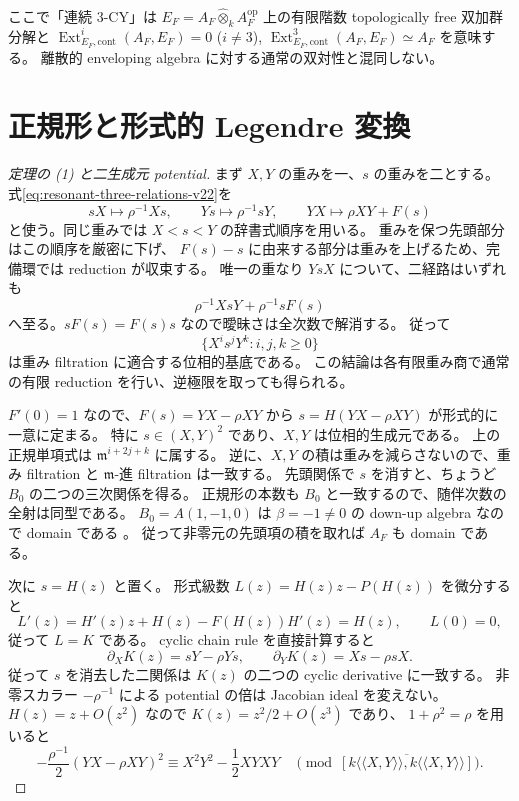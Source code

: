 ここで「連続 $3$-CY」は
$E_F=A_F\widehat\otimes_k A_F^{\mathrm{op}}$ 上の有限階数 topologically free
双加群分解と
$\operatorname{Ext}^i_{E_F,\mathrm{cont}}(A_F,E_F)=0$ ($i\ne3$),
$\operatorname{Ext}^3_{E_F,\mathrm{cont}}(A_F,E_F)\simeq A_F$
を意味する。
離散的 enveloping algebra に対する通常の双対性と混同しない。

\section{正規形と形式的 Legendre 変換}

\begin{proof}[定理の (1) と二生成元 potential]
まず $X,Y$ の重みを一、$s$ の重みを二とする。
式\eqref{eq:resonant-three-relations-v22}を
\[
 sX\longmapsto\rho^{-1}Xs,\qquad
 Ys\longmapsto\rho^{-1}sY,\qquad
 YX\longmapsto\rho XY+F(s)
\]
と使う。同じ重みでは $X<s<Y$ の辞書式順序を用いる。
重みを保つ先頭部分はこの順序を厳密に下げ、
$F(s)-s$ に由来する部分は重みを上げるため、完備環では reduction が収束する。
唯一の重なり $YsX$ について、二経路はいずれも
\[
 \rho^{-1}XsY+\rho^{-1}sF(s)
\]
へ至る。$sF(s)=F(s)s$ なので曖昧さは全次数で解消する。
従って
\[
 \{X^is^jY^k:i,j,k\ge0\}
\]
は重み filtration に適合する位相的基底である。
この結論は各有限重み商で通常の有限 reduction を行い、逆極限を取っても得られる。

$F'(0)=1$ なので、$F(s)=YX-\rho XY$ から
$s=H(YX-\rho XY)$ が形式的に一意に定まる。
特に $s\in(X,Y)^2$ であり、$X,Y$ は位相的生成元である。
上の正規単項式は $\mathfrak m^{i+2j+k}$ に属する。
逆に、$X,Y$ の積は重みを減らさないので、重み filtration と
$\mathfrak m$-進 filtration は一致する。
先頭関係で $s$ を消すと、ちょうど $B_0$ の二つの三次関係を得る。
正規形の本数も $B_0$ と一致するので、随伴次数の全射は同型である。
$B_0=A(1,-1,0)$ は $\beta=-1\ne0$ の down-up algebra なので domain である
\cite[Introduction]{ChouhyHerscovichSolotarDownUp}。
従って非零元の先頭項の積を取れば $A_F$ も domain である。

次に $s=H(z)$ と置く。
形式級数 $L(z)=H(z)z-P(H(z))$ を微分すると
\[
 L'(z)=H'(z)z+H(z)-F(H(z))H'(z)=H(z),\qquad L(0)=0,
\]
従って $L=K$ である。
cyclic chain rule を直接計算すると
\[
 \partial_XK(z)=sY-\rho Ys,\qquad
 \partial_YK(z)=Xs-\rho sX.
\]
従って $s$ を消去した二関係は $K(z)$ の二つの cyclic derivative に一致する。
非零スカラー $-\rho^{-1}$ による potential の倍は Jacobian ideal を変えない。
$H(z)=z+O(z^2)$ なので $K(z)=z^2/2+O(z^3)$ であり、
$1+\rho^2=\rho$ を用いると
\[
 -\frac{\rho^{-1}}2(YX-\rho XY)^2
 \equiv X^2Y^2-\frac12XYXY
 \quad\pmod{\overline{[k\langle\!\langle X,Y\rangle\!\rangle,
                              k\langle\!\langle X,Y\rangle\!\rangle]}}.
\]
\end{proof}

